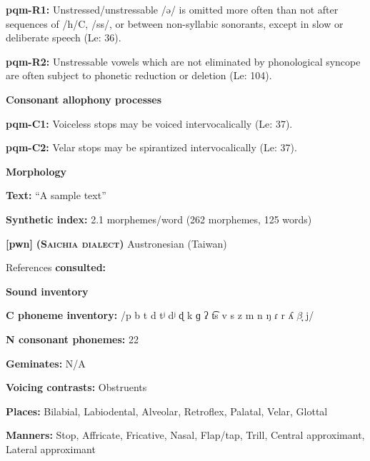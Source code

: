 \textbf{pqm-R1:} Unstressed/unstressable /ə/ is omitted more often than not after sequences of /h/C, /ss/, or between non-syllabic sonorants, except in slow or deliberate speech (Le\citealt{Sourd1996}: 36).



\textbf{pqm-R2:} Unstressable vowels which are not eliminated by phonological syncope are often subject to phonetic reduction or deletion (Le\citealt{Sourd1996}: 104).



\textbf{Consonant allophony processes}



\textbf{pqm-C1:} Voiceless stops may be voiced intervocalically (Le\citealt{Sourd1993}: 37).



\textbf{pqm-C2:} Velar stops may be spirantized intervocalically (Le\citealt{Sourd1993}: 37).



\textbf{Morphology}



\textbf{Text:} “A sample text” \citep[55-58]{Leavitt1996}



\textbf{Synthetic index:} 2.1 morphemes/word (262 morphemes, 125 words)



\textbf{[pwn]}   \textbf{\textsc{ (Saichia dialect)}}  Austronesian (Taiwan)



References \textbf{consulted:} \citet{Chang2006}



\textbf{Sound inventory}



\textbf{C phoneme inventory:} /p b t d tʲ dʲ ɖ k ɡ ʔ t͡s v s z m n ŋ ɾ r ʎ $\beta ̞$ j/



\textbf{N consonant phonemes:} 22



\textbf{Geminates:} N/A



\textbf{Voicing contrasts:} Obstruents



\textbf{Places:} Bilabial, Labiodental, Alveolar, Retroflex, Palatal, Velar, Glottal



\textbf{Manners:} Stop, Affricate, Fricative, Nasal, Flap/tap, Trill, Central approximant, Lateral approximant



